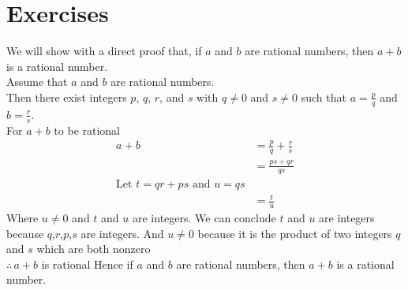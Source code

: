 \documentclass[12pt letter]{report}
\begin{document}
\section{Exercises}



\begin{myproof}
  We will show with a direct proof that, if $a$ and $b$ are rational numbers, then $a + b$ is a rational number. \\
  Assume that $a$ and $b$ are rational numbers. \\
  Then there exist integers $p$, $q$, $r$, and $s$ with $q \neq 0$ and $s \neq 0$ such that $a = \frac{p}{q}$ and $b =
    \frac{r}{s}$.\\
  For $a + b$ to be rational
  \begin{align*}
    a + b & = \frac{p}{q} + \frac{r}{s}  \\
          & = \frac{ps + qr}{qs}         \\
    \text{Let $t =qr + ps$ and $u = qs$} \\
          & = \frac{t}{u}
  \end{align*}
  Where $u \neq 0$ and $t$ and $u$ are integers. We can conclude $t$ and $u$ are integers because $q$,$r$,$p$,$s$ are
  integers. And $u\neq 0$ because it is the product of two integers $q$ and $s$ which are both nonzero\\
  $\therefore \, a + b$ is rational
  Hence if $a$ and $b$ are rational numbers, then $a + b$ is a rational number.
\end{myproof}

\end{document}
